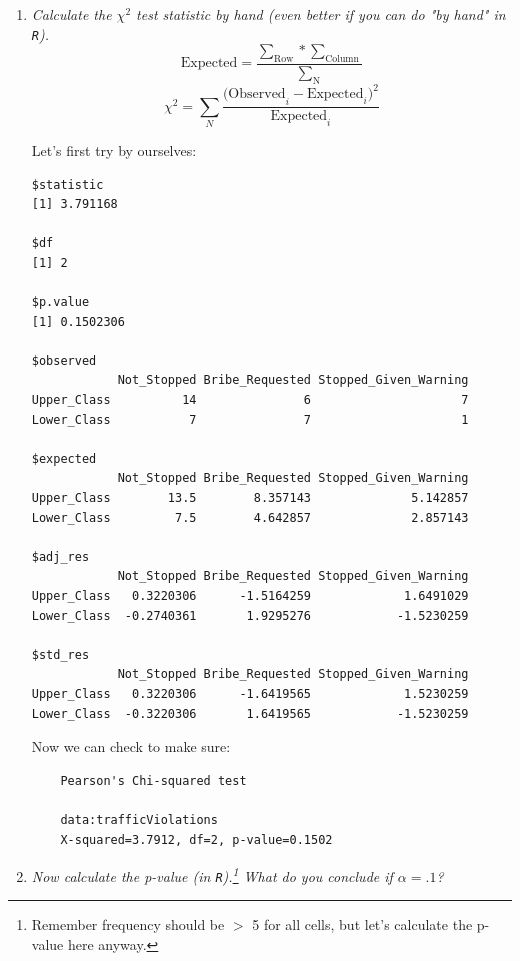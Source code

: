 \documentclass[12pt,letterpaper]{article}
\begin{document}
\begin{enumerate}
	
	\newpage
	\item [(a)]
	\textit{Calculate the $\chi^2$ test statistic by hand (even better if you can do "by hand" in \texttt{R}).}\\
	
	
	$$\text{Expected} =\frac{\sum_{\text{Row}}*\sum_{\text{Column}}}{\sum_{\text{N}}}$$
	$$\chi^2 = \sum_N \frac{\text{(Observed}_i - \text{Expected}_i)^2}{\text{Expected}_i}$$
	
	Let's first try by ourselves:		
	
	  
	\footnotesize
	\begin{verbatim}
$statistic
[1] 3.791168

$df
[1] 2

$p.value
[1] 0.1502306

$observed
            Not_Stopped Bribe_Requested Stopped_Given_Warning
Upper_Class          14               6                     7
Lower_Class           7               7                     1

$expected
            Not_Stopped Bribe_Requested Stopped_Given_Warning
Upper_Class        13.5        8.357143              5.142857
Lower_Class         7.5        4.642857              2.857143

$adj_res
            Not_Stopped Bribe_Requested Stopped_Given_Warning
Upper_Class   0.3220306      -1.5164259             1.6491029
Lower_Class  -0.2740361       1.9295276            -1.5230259

$std_res
            Not_Stopped Bribe_Requested Stopped_Given_Warning
Upper_Class   0.3220306      -1.6419565             1.5230259
Lower_Class  -0.3220306       1.6419565            -1.5230259
	\end{verbatim}
	\normalsize
	Now we can check to make sure:
	
	  
	\footnotesize
	\begin{verbatim}
	Pearson's Chi-squared test
	
	data:trafficViolations
	X-squared=3.7912, df=2, p-value=0.1502
	\end{verbatim}
	\normalsize
	\item [(b)]
	\textit{Now calculate the p-value (in \texttt{R}).\footnote{Remember frequency should be $>$ 5 for all cells, but let's calculate the p-value here anyway.}  What do you conclude if $\alpha = .1$?}\\
	

\end{enumerate}
\end{document}
